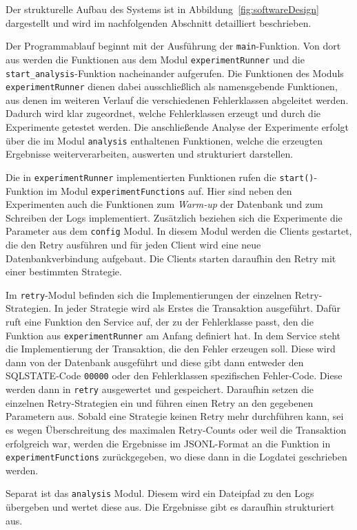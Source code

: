 
Der strukturelle Aufbau des Systems ist in Abbildung~\ref{fig:softwareDesign} dargestellt und wird im
nachfolgenden Abschnitt detailliert beschrieben.


Der Programmablauf beginnt mit der Ausführung der \texttt{main}-Funktion.
Von dort aus werden die Funktionen aus dem Modul \texttt{experimentRunner} und die
\texttt{start\_analysis}-Funktion nacheinander aufgerufen.
Die Funktionen des Moduls \texttt{experimentRunner} dienen dabei ausschließlich als namensgebende Funktionen, aus denen
im weiteren Verlauf die verschiedenen Fehlerklassen abgeleitet werden.
Dadurch wird klar zugeordnet, welche Fehlerklassen erzeugt und durch die Experimente getestet werden.
Die anschließende Analyse der Experimente erfolgt über die im Modul \texttt{analysis} enthaltenen Funktionen,
welche die erzeugten Ergebnisse weiterverarbeiten, auswerten und strukturiert darstellen.

Die in \texttt{experimentRunner} implementierten Funktionen rufen die \texttt{start()}-Funktion im Modul
\texttt{experimentFunctions} auf.
Hier sind neben den Experimenten auch die Funktionen zum \emph{Warm-up} der Datenbank und zum Schreiben der Logs
implementiert.
Zusätzlich beziehen sich die Experimente die Parameter aus dem \texttt{config} Modul.
In diesem Modul werden die Clients gestartet, die den Retry ausführen und für jeden Client wird eine neue
Datenbankverbindung aufgebaut.
Die Clients starten daraufhin den Retry mit einer bestimmten Strategie.

Im \texttt{retry}-Modul befinden sich die Implementierungen der einzelnen Retry-Strategien.
In jeder Strategie wird als Erstes die Transaktion ausgeführt.
Dafür ruft eine Funktion den Service auf, der zu der Fehlerklasse passt, den die Funktion aus
\texttt{experimentRunner} am Anfang definiert hat.
In dem Service steht die Implementierung der Transaktion, die den Fehler erzeugen soll.
Diese wird dann von der Datenbank ausgeführt und diese gibt dann entweder den SQLSTATE-Code \texttt{00000} oder den
Fehlerklassen spezifischen Fehler-Code.
Diese werden dann in \texttt{retry} ausgewertet und gespeichert.
Daraufhin setzen die einzelnen Retry-Strategien ein und führen einen Retry an den gegebenen Parametern aus.
Sobald eine Strategie keinen Retry mehr durchführen kann, sei es wegen Überschreitung des maximalen Retry-Counts oder
weil die Transaktion erfolgreich war, werden die Ergebnisse im JSONL-Format an die Funktion in
\texttt{experimentFunctions} zurückgegeben, wo diese dann in die Logdatei geschrieben werden.

Separat ist das \texttt{analysis} Modul.
Diesem wird ein Dateipfad zu den Logs übergeben und wertet diese aus.
Die Ergebnisse gibt es daraufhin strukturiert aus.
